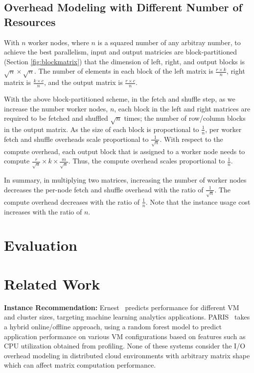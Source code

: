 \documentclass[10pt, conference, compsocconf]{IEEEtran}
\begin{document}
\subsection{Overhead Modeling with Different Number of Resources}\label{sec:overhead-number-of-nodes}
With $n$ worker nodes, where $n$ is a squared number of any arbitray number, to achieve the best parallelism, input and output matricies are block-partitioned (Section \ref{fig:blockmatrix}) that the dimension of left, right, and output blocks is $\sqrt{n} \times \sqrt{n}$. The number of elements in each block of the left matrix is $\frac{r \times k}{n}$, right matrix is $\frac{k \times c}{n}$, and the output matrix is $\frac{r \times c}{n}$.

With the above block-partitioned scheme, in the fetch and shuffle step, as we increase the number worker nodes, $n$, each block in the left and right matrices are required to be fetched and shuffled $\sqrt{n}$ times; the number of row/column blocks in the output matrix. As the size of each block is proportional to $\frac{1}{n}$, per worker fetch and shuffle overheads scale proportional to $\frac{1}{\sqrt{n}}$. With respect to the compute overhead, each output block that is assigned to a worker node needs to compute $\frac{r}{\sqrt{n}}\times k \times \frac{m}{\sqrt{n}}$. Thus, the compute overhead scales proportional to $\frac{1}{n}$.

In summary, in multiplying two matrices, increasing the number of worker nodes decreases the per-node fetch and shuffle overhead with the ratio of $\frac{1}{\sqrt{n}}$. The compute overhead decreases with the ratio of $\frac{1}{n}$. Note that the instance usage cost increases with the ratio of $n$.


\section{Evaluation}{\label{eval}}

\section{Related Work}\label{sec:relatedwork}
\textbf{Instance Recommendation:} Ernest~\cite{venkataraman2016ernest} predicts performance for different VM and cluster sizes, targeting machine learning analytics applications. PARIS~\cite{Yadwadkar:2017:SBV:3127479.3131614} takes a hybrid online/offline approach, using a random forest model to predict application performance on various VM configurations based on features such as CPU utilization obtained from profiling. None of these systems consider the I/O overhead modeling in distributed cloud environments with arbitrary matrix shape which can affect matrix computation performance. 
\end{document}
